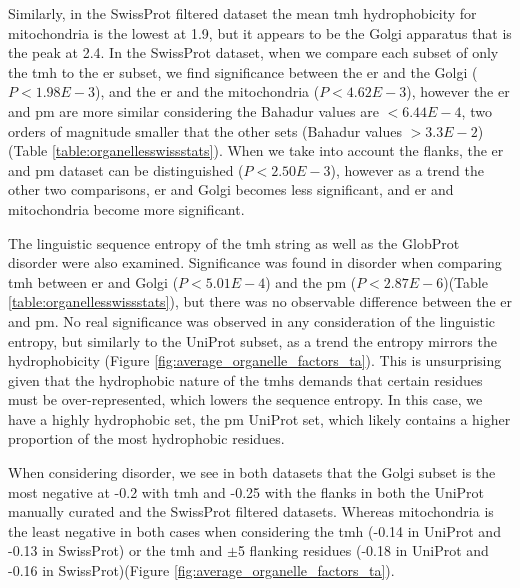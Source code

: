 Similarly, in the SwissProt filtered dataset the mean \gls{tmh} hydrophobicity for mitochondria is the lowest at 1.9, but it appears to be the Golgi apparatus that is the peak at 2.4.
In the SwissProt dataset, when we compare each subset of only the \gls{tmh} to the \gls{er} subset, we find significance between the \gls{er} and the Golgi ($P<1.98E-3$), and the \gls{er} and the mitochondria ($P<4.62E-3$), however the \gls{er} and \gls{pm} are more similar considering the Bahadur values are $<6.44E-4$, two orders of magnitude smaller that the other sets (Bahadur values $>3.3E-2$) (Table \ref{table:organellesswissstats}).
When we take into account the flanks, the \gls{er} and \gls{pm} dataset can be distinguished ($P<2.50E-3$), however as a trend the other two comparisons, \gls{er} and Golgi becomes less significant, and \gls{er} and mitochondria become more significant.

The linguistic sequence entropy of the \gls{tmh} string as well as the GlobProt disorder were also examined.
Significance was found in disorder when comparing \gls{tmh} between \gls{er} and Golgi ($P<5.01E-4$) and the \gls{pm} ($P<2.87E-6$)(Table \ref{table:organellesswissstats}), but there was no observable difference between the \gls{er} and \gls{pm}.
No real significance was observed in any consideration of the linguistic entropy, but similarly to the UniProt subset, as a trend the entropy mirrors the hydrophobicity (Figure \ref{fig:average_organelle_factors_ta}).
This is unsurprising given that the hydrophobic nature of the \gls{tmh}s demands that certain residues must be over-represented, which lowers the sequence entropy.
In this case, we have a highly hydrophobic set, the \gls{pm} UniProt set, which likely contains a higher proportion of the most hydrophobic residues.

When considering disorder, we see in both datasets that the Golgi subset is the most negative at -0.2 with \gls{tmh} and -0.25 with the flanks in both the UniProt manually curated and the SwissProt filtered datasets.
Whereas mitochondria is the least negative in both cases when considering the \gls{tmh} (-0.14 in UniProt and -0.13 in SwissProt) or the \gls{tmh} and $\pm$5 flanking residues (-0.18 in UniProt and -0.16 in SwissProt)(Figure \ref{fig:average_organelle_factors_ta}).







